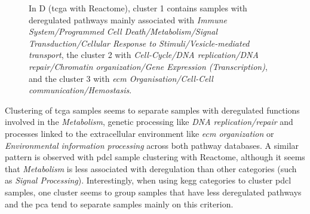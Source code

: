 \begin{figure}
\begin{center}
{            In D (\acrshort{tcga} with Reactome), cluster 1 contains samples with deregulated pathways mainly associated with \textit{Immune System/Programmed Cell Death/Metabolism/Signal Transduction/Cellular Response to Stimuli/Vesicle-mediated transport}, the cluster 2 with \textit{Cell-Cycle/DNA replication/DNA repair/Chromatin organization/Gene Expression (Transcription)}, and the cluster 3 with \textit{\acrlong{ecm} Organisation/Cell-Cell communication/Hemostasis}.
        }
        \label{fig:cluster-plot}
    \end{center}
\end{figure}

Clustering of \acrshort{tcga} samples seems to separate samples with deregulated functions involved in the \textit{Metabolism}, genetic processing like \textit{DNA replication/repair} and processes linked to the extracellular environment like \textit{\acrshort{ecm} organization} or \textit{Environmental information processing} across both pathway databases.
A similar pattern is observed with \acrshort{pdcl} sample clustering with Reactome, although it seems that \textit{Metabolism} is less associated with deregulation than other categories (such as \textit{Signal Processing}).
Interestingly, when using \acrshort{kegg} categories to cluster \acrshort{pdcl} samples, one cluster seems to group samples that have less deregulated pathways and the \acrshort{pca} tend to separate samples mainly on this criterion.
